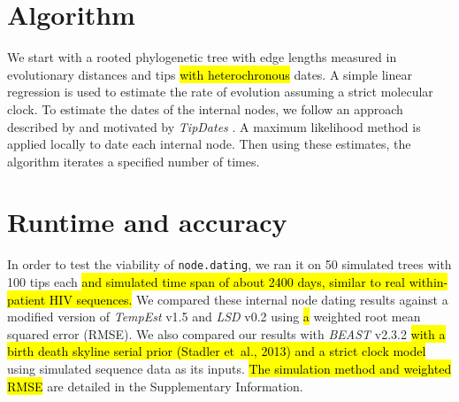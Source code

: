\documentclass{bioinfo}
\newcommand{\code}[1]{{\tt #1}}
\newcommand{\edit}[1]{\hl{#1}}
\begin{document}
\vspace*{-18pt}

\section{Algorithm} \label{sec:alg}
We start with a rooted phylogenetic tree with edge lengths measured in evolutionary distances and tips \edit{with heterochronous} dates.
A simple linear regression is used to estimate the rate of evolution assuming a strict molecular clock.
To estimate the dates of the internal nodes, we follow an approach described by \cite{Felsenstein81} and motivated by \emph{TipDates} \citep{TipDates}.
A maximum likelihood method is applied locally to date each internal node.
Then using these estimates, the algorithm iterates a specified number of times.

\vspace*{-18pt}

\section{Runtime and accuracy} \label{sec:tests}
In order to test the viability of \code{node.dating}, we ran it on 50 simulated trees with 100 tips each \edit{and simulated time span of about 2400 days, similar to real within-patient HIV sequences.}
We compared these internal node dating results against a modified version of \emph{TempEst} v1.5 and \emph{LSD} v0.2 using \edit{a} weighted root mean squared error (RMSE).
We also compared our results with \emph{BEAST} v2.3.2 \edit{with a birth death skyline serial prior (Stadler et~al., 2013) and a strict clock model} using simulated sequence data as its inputs.
\edit{The simulation method and weighted RMSE} are detailed in the Supplementary Information.
\end{document}
